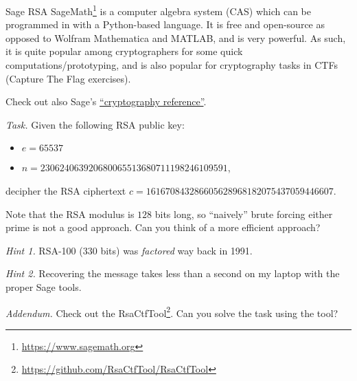 \documentclass{practice}
\begin{document}
\newpage

\begin{task}{Sage RSA}
  SageMath\footnote{\url{https://www.sagemath.org}} is a computer algebra system (CAS) which can be programmed in with a Python-based language.
  It is free and open-source as opposed to Wolfram Mathematica and MATLAB, and is very powerful.
  As such, it is quite popular among cryptographers for some quick computations/prototyping, and is also popular for cryptography tasks in CTFs (Capture The Flag exercises).

  Check out also Sage's \href{https://doc.sagemath.org/html/en/reference/cryptography/index.html}{\enquote{cryptography reference}}.

  \textit{Task.}
  Given the following RSA public key:
  \begin{itemize}
    \item $e = 65537$
    \item $n = 230624063920680065513680711198246109591$,
  \end{itemize}
  decipher the RSA ciphertext $c = 161670843286605628968182075437059446607$.

  Note that the RSA modulus is $128$ bits long, so \enquote{naively} brute forcing either prime is not a good approach.
  Can you think of a more efficient approach?
  
  \textit{Hint 1.}
  RSA-100 ($330$ bits) was \emph{factored} way back in 1991.

  \textit{Hint 2.}
  Recovering the message takes less than a second on my laptop with the proper Sage tools.

  \textit{Addendum.}
  Check out the RsaCtfTool\footnote{\url{https://github.com/RsaCtfTool/RsaCtfTool}}.
  Can you solve the task using the tool?
\end{task}
\end{document}
